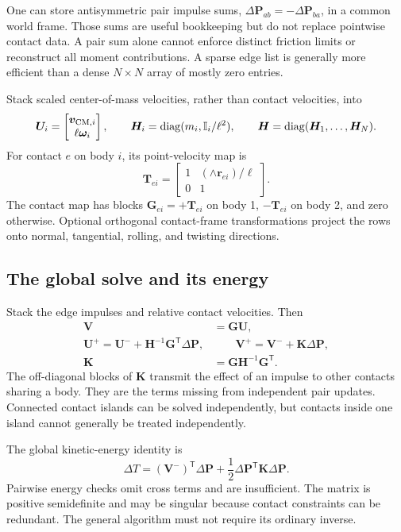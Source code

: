 \documentclass[11pt,a4paper]{article}
\newcommand{\bv}[1]{\bm{#1}}\newcommand{\inertia}{\mathbb I}
\begin{document}
One can store antisymmetric pair impulse sums, $\Delta\bv P_{ab}=-\Delta\bv P_{ba}$, in a common world frame. Those sums are useful bookkeeping but do not replace pointwise contact data. A pair sum alone cannot enforce distinct friction limits or reconstruct all moment contributions. A sparse edge list is generally more efficient than a dense $N\times N$ array of mostly zero entries.

Stack scaled center-of-mass velocities, rather than contact velocities, into
\begin{equation}
\bv U_i=\begin{bmatrix}\bv v_{{\rm CM},i}\\\ell\bv\omega_i\end{bmatrix},
\qquad \bv H_i=\operatorname{diag}(m_i,\inertia_i/\ell^2),
\qquad \bv H=\operatorname{diag}(\bv H_1,\ldots,\bv H_N).
\end{equation}
For contact $e$ on body $i$, its point-velocity map is
\begin{equation}
\bv T_{ei}=
\begin{bmatrix}1&(\wedge\bv r_{ei})/\ell\\0&1\end{bmatrix}.
\end{equation}
The contact map has blocks $\bv G_{ei}=+\bv T_{ei}$ on body 1, $-\bv T_{ei}$ on body 2, and zero otherwise. Optional orthogonal contact-frame transformations project the rows onto normal, tangential, rolling, and twisting directions.

\subsection{The global solve and its energy}
Stack the edge impulses and relative contact velocities. Then
\begin{align}
\bv V&=\bv G\bv U,\\
\boxed{\bv U^+=\bv U^-+\bv H^{-1}\bv G^{\mathsf T}\Delta\bv P},&
\qquad
\boxed{\bv V^+=\bv V^-+\bv K\Delta\bv P},\\
\bv K&=\bv G\bv H^{-1}\bv G^{\mathsf T}.
\end{align}
The off-diagonal blocks of $\bv K$ transmit the effect of an impulse to other contacts sharing a body. They are the terms missing from independent pair updates. Connected contact islands can be solved independently, but contacts inside one island cannot generally be treated independently.

The global kinetic-energy identity is
\begin{equation}
\boxed{\Delta T=(\bv V^-)^{\mathsf T}\Delta\bv P+
\frac12\Delta\bv P^{\mathsf T}\bv K\Delta\bv P.}
\end{equation}
Pairwise energy checks omit cross terms and are insufficient. The matrix is positive semidefinite and may be singular because contact constraints can be redundant. The general algorithm must not require its ordinary inverse.
\end{document}
